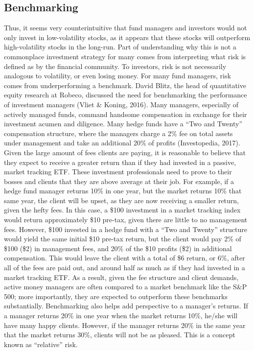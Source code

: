\documentclass[12pt,twoside]{reedthesis}
\theoremstyle{definition}
\theoremstyle{definition}
\theoremstyle{definition}
\theoremstyle{remark}
\begin{document}
\subsection{Benchmarking}\label{benchmarking}

Thus, it seems very counterintuitive that fund managers and investors
would not only invest in low-volatility stocks, as it appears that these
stocks will outperform high-volatility stocks in the long-run. Part of
understanding why this is not a commonplace investment strategy for many
comes from interpreting what risk is defined as by the financial
community. To investors, risk is not necessarily analogous to
volatility, or even losing money. For many fund managers, risk comes
from underperforming a benchmark. David Blitz, the head of quantitative
equity research at Robeco, discussed the need for benchmarking the
performance of investment managers (Vliet \& Koning, 2016). Many
managers, especially of actively managed funds, command handsome
compensation in exchange for their investment acumen and diligence. Many
hedge funds have a ``Two and Twenty'' compensation structure, where the
managers charge a 2\% fee on total assets under management and take an
additional 20\% of profits (Investopedia, 2017). Given the large amount
of fees clients are paying, it is reasonable to believe that they expect
to receive a greater return than if they had invested in a passive,
market tracking ETF. These investment professionals need to prove to
their bosses and clients that they are above average at their job. For
example, if a hedge fund manager returns 10\% in one year, but the
market returns 10\% that same year, the client will be upset, as they
are now receiving a smaller return, given the hefty fees. In this case,
a \$100 investment in a market tracking index would return approximately
\$10 pre-tax, given there are little to no management fees. However,
\$100 invested in a hedge fund with a ``Two and Twenty'' structure would
yield the same initial \$10 pre-tax return, but the client would pay 2\%
of \$100 (\$2) in management fees, and 20\% of the \$10 profits (\$2) in
additional compensation. This would leave the client with a total of \$6
return, or 6\%, after all of the fees are paid out, and around half as
much as if they had invested in a market tracking ETF. As a result,
given the fee structure and client demands, active money managers are
often compared to a market benchmark like the S\&P 500; more
importantly, they are expected to outperform these benchmarks
substantially. Benchmarking also helps add perspective to a manager's
returns. If a manager returns 20\% in one year when the market returns
10\%, he/she will have many happy clients. However, if the manager
returns 20\% in the same year that the market returns 30\%, clients will
not be as pleased. This is a concept known as ``relative'' risk.
\end{document}
